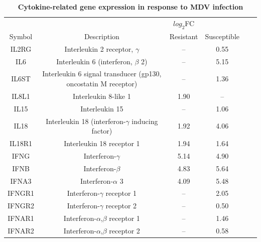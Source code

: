 \documentclass[10pt]{article}
\begin{document}
\begin{table}[!ht]
\caption{
\bf{Cytokine-related gene expression in response to MDV infection}}
    \begin{tabular}{cccccc}
        \hline
        & & $log_{2}$FC & \\
        Symbol & Description & Resistant & Susceptible \\
        \hline
        IL2RG & Interleukin 2 receptor, $\gamma$ & -- & 0.55 \\
        IL6 & Interleukin 6 (interferon, $\beta$ 2) & -- & 5.15 \\
        IL6ST & Interleukin 6 signal transducer (gp130, oncostatin M receptor) & -- & 1.36 \\
        IL8L1 & Interleukin 8-like 1 & 1.90 & -- \\
        IL15 & Interleukin 15 & -- & 1.06 \\
        IL18 & Interleukin 18 (interferon-$\gamma$ inducing factor) & 1.92 & 4.06 \\
        IL18R1 & Interleukin 18 receptor 1 & 1.94 & 1.64 \\
        IFNG & Interferon-$\gamma$ & 5.14 & 4.90 \\
        IFNB & Interferon-$\beta$ & 4.83 & 5.64 \\
        IFNA3 & Interferon-$\alpha$ 3 & 4.09 & 5.48 \\
        IFNGR1 & Interferon-$\gamma$ receptor 1 & -- & 2.05 \\
        IFNGR2 & Interferon-$\gamma$ receptor 2& -- & 0.50 \\
        IFNAR1 & Interferon-$\alpha$,$\beta$ receptor 1 & -- & 1.46 \\
        IFNAR2 & Interferon-$\alpha$,$\beta$ receptor 2 & -- & 0.58 \\
        \hline
    \end{tabular}
    \begin{flushleft}
    \end{flushleft}
    \label{tab:cytokines}
\end{table}

\end{document}
